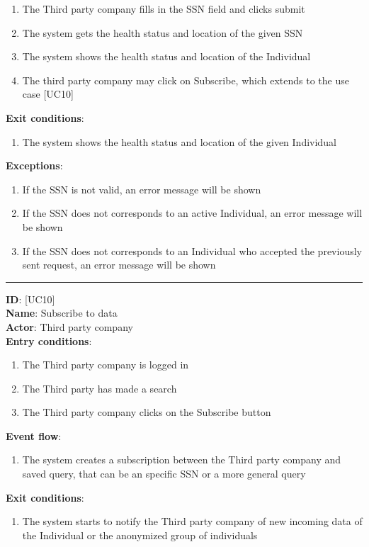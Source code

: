 \documentclass[hidelinks, 12pt]{report}
\newcommand\usecase[1]{ [UC#1] }
\begin{document}
\begin{itemize}
\begin{enumerate}
			\item{The Third party company fills in the SSN field and clicks submit}
			\item{The system gets the health status and location of the given SSN}
			\item{The system shows the health status and location of the Individual}
			\item{The third party company may click on Subscribe, which extends to the use case \usecase{10}}
		\end{enumerate}
		\textbf{Exit conditions}:
		\begin{enumerate}
			\item{The system shows the health status and location of the given Individual}
		\end{enumerate}
		\textbf{Exceptions}:
		\begin{enumerate}
			\item{If the SSN is not valid, an error message will be shown}
			\item{If the SSN does not corresponds to an active Individual, an error message will be shown}
			\item{If the SSN does not corresponds to an Individual who accepted the previously sent request, an error message will be shown}
		\end{enumerate}
		\rule{\linewidth}{0.4pt}
		\textbf{ID}: \usecase{10} \\
		\textbf{Name}: Subscribe to data \\
		\textbf{Actor}: Third party company \\
		\textbf{Entry conditions}:
		\begin{enumerate}
			\item{The Third party company is logged in}
			\item{The Third party has made a search}
			\item{The Third party company clicks on the Subscribe button}
		\end{enumerate}
		\textbf{Event flow}:
		\begin{enumerate}
			\item{The system creates a subscription between the Third party company and saved query, that can be an specific SSN or a more general query}
		\end{enumerate}
		\textbf{Exit conditions}:
		\begin{enumerate}
			\item{The system starts to notify the Third party company of new incoming data of the Individual or the anonymized group of individuals}

\end{enumerate}
\end{itemize}
\end{document}
